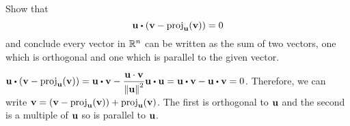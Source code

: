 \begin{ex}
  Show that
  \begin{equation*}
    \vect{u}\dotprod(\vect{v}-\proj_{\vect{u}}(\vect{v}))=0
  \end{equation*}
  and conclude every vector in $\mathbb{R}^{n}$ can be written as the sum of
  two vectors, one which is orthogonal and one which is parallel to
  the given vector.
  \begin{sol}
    $\displaystyle\vect{u}\dotprod(\vect{v}-\proj_{\vect{u}}(\vect{v}))
    = \vect{u} \dotprod \vect{v}-\frac{\vect{u}\cdot\vect{v}}{\norm{\vect{u}}^{2}}\vect{u}\dotprod\vect{u}
    = \vect{u} \dotprod \vect{v}
    - \vect{u} \dotprod \vect{v}
    =0$. Therefore, we can write
    $\vect{v} = (\vect{v} - \proj_{\vect{u}}(\vect{v})) +
    \proj_{\vect{u}}(\vect{v})$. The first is orthogonal to
    $\vect{u}$ and the second is a multiple of $\vect{u}$ so is
    parallel to $\vect{u}$.
  \end{sol}
\end{ex}

